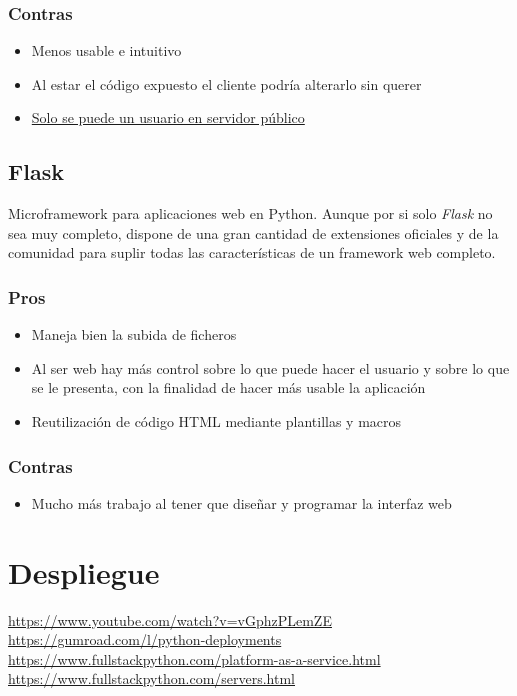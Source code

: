 \subsubsection{Contras}
\begin{itemize}
	\item Menos usable e intuitivo
	\item Al estar el código expuesto el cliente podría alterarlo sin querer
	\item
	\href{http://jupyter-notebook.readthedocs.io/en/latest/public_server.html}{Solo
		se puede un usuario en servidor público}
\end{itemize}

\subsection{Flask}
Microframework para aplicaciones web en Python. Aunque por si solo
\textit{Flask} no sea muy completo, dispone de una gran cantidad de extensiones
oficiales y de la comunidad para suplir todas las características de un
framework web completo.
\subsubsection{Pros}
\begin{itemize}
	\item Maneja bien la subida de ficheros
	\item Al ser web hay más control sobre lo que puede hacer el usuario y sobre lo
	que se le presenta, con la finalidad de hacer más usable la aplicación
	\item Reutilización de código HTML mediante plantillas y macros
\end{itemize}
\subsubsection{Contras}
\begin{itemize}
	\item Mucho más trabajo al tener que diseñar y programar la interfaz web
\end{itemize}

\section{Despliegue}
\url{https://www.youtube.com/watch?v=vGphzPLemZE}\\
\url{https://gumroad.com/l/python-deployments}\\
\url{https://www.fullstackpython.com/platform-as-a-service.html}\\
\url{https://www.fullstackpython.com/servers.html}

